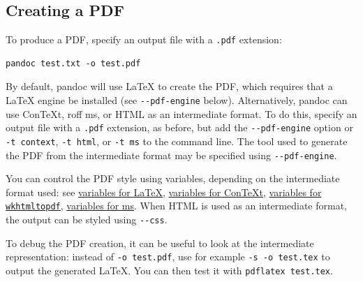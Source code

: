 \documentclass[
]{article}
\begin{document}
\hypertarget{creating-a-pdf}{%
\subsection{Creating a PDF}\label{creating-a-pdf}}

To produce a PDF, specify an output file with a \texttt{.pdf} extension:

\begin{verbatim}
pandoc test.txt -o test.pdf
\end{verbatim}

By default, pandoc will use LaTeX to create the PDF, which requires that
a LaTeX engine be installed (see \texttt{-\/-pdf-engine} below).
Alternatively, pandoc can use ConTeXt, roff ms, or HTML as an
intermediate format. To do this, specify an output file with a
\texttt{.pdf} extension, as before, but add the \texttt{-\/-pdf-engine}
option or \texttt{-t\ context}, \texttt{-t\ html}, or \texttt{-t\ ms} to
the command line. The tool used to generate the PDF from the
intermediate format may be specified using \texttt{-\/-pdf-engine}.

You can control the PDF style using variables, depending on the
intermediate format used: see
\protect\hyperlink{variables-for-latex}{variables for LaTeX},
\protect\hyperlink{variables-for-context}{variables for ConTeXt},
\protect\hyperlink{variables-for-wkhtmltopdf}{variables for
\texttt{wkhtmltopdf}}, \protect\hyperlink{variables-for-ms}{variables
for ms}. When HTML is used as an intermediate format, the output can be
styled using \texttt{-\/-css}.

To debug the PDF creation, it can be useful to look at the intermediate
representation: instead of \texttt{-o\ test.pdf}, use for example
\texttt{-s\ -o\ test.tex} to output the generated LaTeX. You can then
test it with \texttt{pdflatex\ test.tex}.
\end{document}
